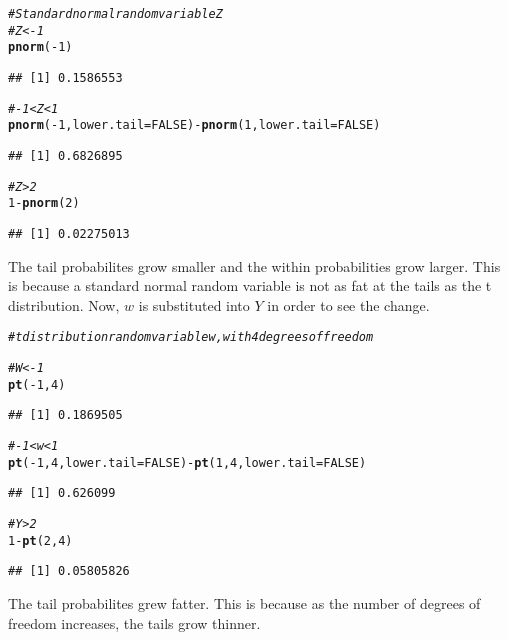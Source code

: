 \documentclass[12pt]{article}\usepackage[]{graphicx}\usepackage[]{color}
\makeatletter
\newcommand{\hlnum}[1]{\textcolor[rgb]{0.686,0.059,0.569}{#1}}%
\newcommand{\hlcom}[1]{\textcolor[rgb]{0.678,0.584,0.686}{\textit{#1}}}%
\newcommand{\hlopt}[1]{\textcolor[rgb]{0,0,0}{#1}}%
\newcommand{\hlstd}[1]{\textcolor[rgb]{0.345,0.345,0.345}{#1}}%
\newcommand{\hlkwc}[1]{\textcolor[rgb]{0.333,0.667,0.333}{#1}}%
\newcommand{\hlkwd}[1]{\textcolor[rgb]{0.737,0.353,0.396}{\textbf{#1}}}%
\newenvironment{kframe}{%
 \def\at@end@of@kframe{}%
 \ifinner\ifhmode%
  \def\at@end@of@kframe{\end{minipage}}%
  \begin{minipage}{\columnwidth}%
 \fi\fi%
 \def\FrameCommand##1{\hskip\@totalleftmargin \hskip-\fboxsep
 \colorbox{shadecolor}{##1}\hskip-\fboxsep
     \hskip-\linewidth \hskip-\@totalleftmargin \hskip\columnwidth}%
 \MakeFramed {\advance\hsize-\width
   \@totalleftmargin\z@ \linewidth\hsize
   \@setminipage}}%
 {\par\unskip\endMakeFramed%
 \at@end@of@kframe}
\newenvironment{knitrout}{}{} %
\newenvironment{Answer}[2][Answer]{\begin{trivlist}
\item[\hskip \labelsep {\bfseries #1}\hskip \labelsep {\bfseries #2.}]}{\end{trivlist}}
\makeatother
\begin{document}
\begin{Answer}{2}
\begin{knitrout}
\color{fgcolor}\begin{kframe}
\begin{alltt}
\hlcom{# Standard normal random variable Z}
\hlcom{# Z < -1}
\hlkwd{pnorm}\hlstd{(}\hlopt{-}\hlnum{1}\hlstd{)}
\end{alltt}
\begin{verbatim}
## [1] 0.1586553
\end{verbatim}
\begin{alltt}
\hlcom{# -1 < Z < 1}
\hlkwd{pnorm}\hlstd{(}\hlopt{-}\hlnum{1}\hlstd{,}\hlkwc{lower.tail}\hlstd{=}\hlnum{FALSE}\hlstd{)}\hlopt{-}\hlkwd{pnorm}\hlstd{(}\hlnum{1}\hlstd{,}\hlkwc{lower.tail}\hlstd{=}\hlnum{FALSE}\hlstd{)}
\end{alltt}
\begin{verbatim}
## [1] 0.6826895
\end{verbatim}
\begin{alltt}
\hlcom{# Z > 2}
\hlnum{1}\hlopt{-}\hlkwd{pnorm}\hlstd{(}\hlnum{2}\hlstd{)}
\end{alltt}
\begin{verbatim}
## [1] 0.02275013
\end{verbatim}
\end{kframe}
\end{knitrout}
The tail probabilites grow smaller and the within probabilities grow larger. This is because a standard normal random variable is not as fat at the tails as the t distribution. Now, $w$ is substituted into $Y$ in order to see the change.
\begin{knitrout}
\color{fgcolor}\begin{kframe}
\begin{alltt}
\hlcom{# t distribution random variable w, with 4 degrees of freedom}

\hlcom{# W < -1}
\hlkwd{pt}\hlstd{(}\hlopt{-}\hlnum{1}\hlstd{,}\hlnum{4}\hlstd{)}
\end{alltt}
\begin{verbatim}
## [1] 0.1869505
\end{verbatim}
\begin{alltt}
\hlcom{# -1 < w < 1}
\hlkwd{pt}\hlstd{(}\hlopt{-}\hlnum{1}\hlstd{,}\hlnum{4}\hlstd{,}\hlkwc{lower.tail}\hlstd{=}\hlnum{FALSE}\hlstd{)}\hlopt{-}\hlkwd{pt}\hlstd{(}\hlnum{1}\hlstd{,}\hlnum{4}\hlstd{,}\hlkwc{lower.tail}\hlstd{=}\hlnum{FALSE}\hlstd{)}
\end{alltt}
\begin{verbatim}
## [1] 0.626099
\end{verbatim}
\begin{alltt}
\hlcom{# Y > 2}
\hlnum{1}\hlopt{-}\hlkwd{pt}\hlstd{(}\hlnum{2}\hlstd{,}\hlnum{4}\hlstd{)}
\end{alltt}
\begin{verbatim}
## [1] 0.05805826
\end{verbatim}
\end{kframe}
\end{knitrout}
The tail probabilites grew fatter. This is because as the number of degrees of freedom increases, the tails grow thinner.


\end{Answer}
\end{document}
